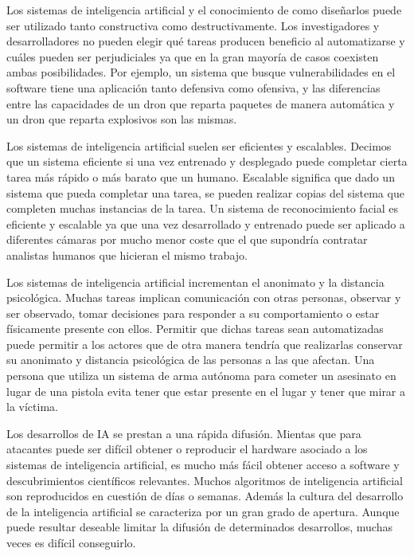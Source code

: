\documentclass[12pt,a4paper]{article}
\begin{document}
Los sistemas de inteligencia artificial y el conocimiento de como diseñarlos puede ser utilizado tanto constructiva como destructivamente. Los investigadores y desarrolladores no pueden elegir qué tareas producen beneficio al automatizarse y cuáles pueden ser perjudiciales ya que en la gran mayoría de casos coexisten ambas posibilidades. Por ejemplo, un sistema que busque vulnerabilidades en el software tiene una aplicación tanto defensiva como ofensiva, y las diferencias entre las capacidades de un dron que reparta paquetes de manera automática y un dron que reparta explosivos son las mismas.

Los sistemas de inteligencia artificial suelen ser eficientes y escalables. Decimos que un sistema eficiente si una vez entrenado y desplegado puede completar cierta tarea más rápido o más barato que un humano. Escalable significa que dado un sistema que pueda completar una tarea, se pueden realizar copias del sistema que completen muchas instancias de la tarea. Un sistema de reconocimiento facial es eficiente y escalable ya que una vez desarrollado y entrenado puede ser aplicado a diferentes cámaras por mucho menor coste que el que supondría contratar analistas humanos que hicieran el mismo trabajo.

Los sistemas de inteligencia artificial incrementan el anonimato y la distancia psicológica. Muchas tareas implican comunicación con otras personas, observar y ser observado, tomar decisiones para responder a su comportamiento o estar físicamente presente con ellos. Permitir que dichas tareas sean automatizadas puede permitir a los actores que de otra manera tendría que realizarlas conservar su anonimato y distancia psicológica de las personas a las que afectan. Una persona que utiliza un sistema de arma autónoma para cometer un asesinato en lugar de una pistola evita tener que estar presente en el lugar y tener que mirar a la víctima.

Los desarrollos de IA se prestan a una rápida difusión. Mientas que para atacantes puede ser difícil obtener o reproducir el hardware asociado a los sistemas de inteligencia artificial, es mucho más fácil obtener acceso a software y descubrimientos científicos relevantes. Muchos algoritmos de inteligencia artificial son reproducidos en cuestión de días o semanas. Además la cultura del desarrollo de la inteligencia artificial se caracteriza por un gran grado de apertura. Aunque puede resultar deseable limitar la difusión de determinados desarrollos, muchas veces es difícil conseguirlo.
\end{document}
